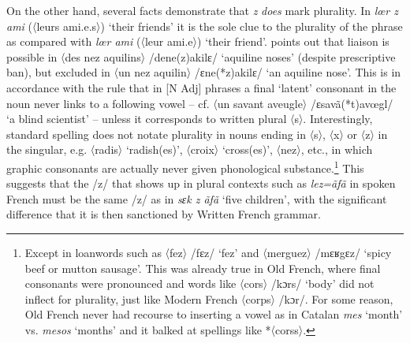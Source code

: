 \documentclass[output=paper]{langscibook}
\begin{document}
On the other hand, several facts demonstrate that \textit{z} \textit{does} mark plurality. In \textit{lœr z ami} (〈leurs ami.e.s〉) ‘their friends’ it is the sole clue to the plurality of the phrase as compared with \textit{lœr ami} (〈leur ami.e〉) ‘their friend’. \citet{Gougenheim1938} points out that liaison is possible in 〈des nez aquilins〉 /dene(z)akilɛ/ ‘aquiline noses’ (despite prescriptive ban), but excluded in 〈un nez aquilin〉 /ɛne(*z)akilɛ/ ‘an aquiline nose’. This is in accordance with the rule that in [N Adj] phrases a final ‘latent’ consonant in the noun never links to a following vowel -- cf. 〈un savant aveugle〉 /ɛsavã(*t)avœgl/ ‘a blind scientist’ -- unless it corresponds to written plural 〈s〉. Interestingly, standard spelling does not notate plurality in nouns ending in 〈s〉, 〈x〉 or 〈z〉 in the singular, e.g. 〈radis〉 ‘radish(es)’, 〈croix〉 ‘cross(es)’, 〈nez〉, etc., in which graphic consonants are actually never given phonological substance.\footnote{Except in loanwords such as 〈fez〉 /fɛz/ ‘fez’ and 〈merguez〉 /mɛʁgɛz/ ‘spicy beef or mutton sausage’. This was already true in Old French, where final consonants were pronounced and words like 〈cors〉 /kɔrs/ ‘body’ did not inflect for plurality, just like Modern French 〈corps〉 /kɔr/. For some reason, Old French never had recourse to inserting a vowel as in Catalan \textit{mes} ‘month’ vs. \textit{mesos} ‘months’ and it balked at spellings like *〈corss〉.} This suggests that the /z/ that shows up in plural contexts such as \textit{lez=ãfã} in  spoken French must be the same /z/ as in \textit{sɛk z ãfã} ‘five children’, with the significant difference that it is then sanctioned by Written French grammar.
\end{document}
